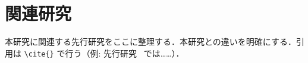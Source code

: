 \section{関連研究}
本研究に関連する先行研究をここに整理する．本研究との違いを明確にする．引用は \verb|\cite{}| で行う（例: 先行研究~\cite{sample2024} では……）．
